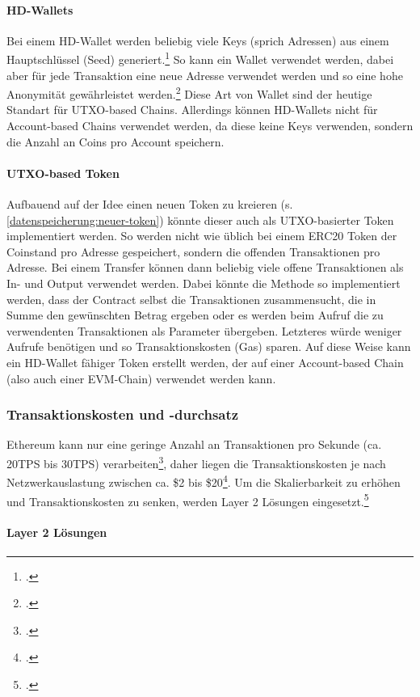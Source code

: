 \documentclass[12pt, a4paper]{article}
\begin{document}
{\paragraph{HD-Wallets}
Bei einem HD-Wallet werden beliebig viele Keys (sprich Adressen) aus einem Hauptschlüssel (Seed) generiert.\footcite[Vgl. hierzu und weiterführend][S. 8 ff\adddot]{q9}
So kann ein Wallet verwendet werden, dabei aber für jede Transaktion eine neue Adresse verwendet werden und so eine hohe Anonymität gewährleistet werden.\footcite[Vgl.][231]{q5}
Diese Art von Wallet sind der heutige Standart für UTXO-based Chains.
Allerdings können HD-Wallets nicht für Account-based Chains verwendet werden, da diese keine Keys verwenden, sondern die Anzahl an Coins pro Account speichern.

\paragraph{UTXO-based Token}
Aufbauend auf der Idee einen neuen Token zu kreieren (s. \ref{datenspeicherung:neuer-token}) könnte dieser auch als UTXO-basierter Token implementiert werden.
So werden nicht wie üblich bei einem ERC20 Token der Coinstand pro Adresse gespeichert, sondern die offenden Transaktionen pro Adresse.
Bei einem Transfer können dann beliebig viele offene Transaktionen als In- und Output verwendet werden.
Dabei könnte die Methode so implementiert werden, dass der Contract selbst die Transaktionen zusammensucht, die in Summe den gewünschten Betrag ergeben oder es werden beim Aufruf die zu verwendenten Transaktionen als Parameter übergeben.
Letzteres würde weniger Aufrufe benötigen und so Transaktionskosten (Gas) sparen.
Auf diese Weise kann ein HD-Wallet fähiger Token erstellt werden, der auf einer Account-based Chain (also auch einer EVM-Chain) verwendet werden kann.
\subsubsection{Transaktionskosten und -durchsatz}
Ethereum kann nur eine geringe Anzahl an Transaktionen pro Sekunde (ca. 20TPS bis 30TPS)  verarbeiten\footcite[Vgl.][]{w36}, daher liegen die Transaktionskosten je nach Netzwerkauslastung zwischen ca. \$2 bis \$20\footcite[Vgl.][]{w35}.
Um die Skalierbarkeit zu erhöhen und Transaktionskosten zu senken, werden Layer 2 Lösungen eingesetzt.\footcite[Vgl.][]{w17}

\paragraph{Layer 2 Lösungen}
\label{sec:definition-layer-2-solutions}

}
\end{document}
